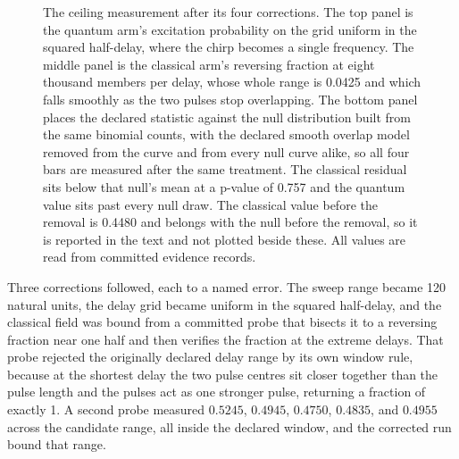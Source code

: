 \documentclass[aps,pre,reprint,nofootinbib,floatfix]{revtex4-2}
\begin{document}
\begin{figure}[t]
\centering
{}
\caption{The ceiling measurement after its four corrections.  The top
panel is the quantum arm's excitation probability on the grid uniform
in the squared half-delay, where the chirp becomes a single frequency.
The middle panel is the classical arm's reversing fraction at eight
thousand members per delay, whose whole range is 0.0425 and which falls
smoothly as the two pulses stop overlapping.  The bottom panel places
the declared statistic against the null distribution built from the
same binomial counts, with the declared smooth overlap model removed
from the curve and from every null curve alike, so all four bars are
measured after the same treatment.  The classical residual sits below
that null's mean at a p-value of 0.757 and the quantum value sits past
every null draw.  The classical value before the removal is 0.4480 and
belongs with the null before the removal, so it is reported in the text
and not plotted beside these.  All values are read from committed
evidence records.}
\label{fig:pf7}
\end{figure}

Three corrections followed, each to a named error.  The sweep range
became 120 natural units, the delay grid became uniform in the squared
half-delay, and the classical field was bound from a committed probe
that bisects it to a reversing fraction near one half and then verifies
the fraction at the extreme delays.  That probe rejected the originally
declared delay range by its own window rule, because at the shortest
delay the two pulse centres sit closer together than the pulse length
and the pulses act as one stronger pulse, returning a fraction of
exactly 1.  A second probe measured $0.5245$, $0.4945$, $0.4750$,
$0.4835$, and $0.4955$ across the candidate range, all inside the
declared window, and the corrected run bound that range.
\end{document}
